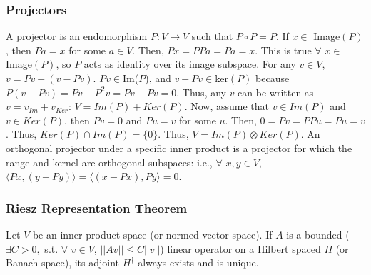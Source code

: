 \documentclass[11pt]{article}
\begin{document}
	\subsubsection*{Projectors}
	A projector	is an endomorphism $P: V\rightarrow V$ such that $P\circ P = P$. If $x\in$ Image$(P)$, then $Pa=x$ for some $a\in V$. Then, $Px = PPa = Pa = x$. This is true $\forall$ $x\in$ Image$(P)$, so $P$ acts as identity over its image subspace. For any $v\in V$, $v = Pv + (v - Pv)$. $Pv\in$Im($P$), and $v-Pv\in$ker$(P)$ because $P(v-Pv)=Pv-P^2v=Pv-Pv=0$. Thus, any $v$ can be written as $v=v_{Im}+v_{Ker}$: $V = Im(P) + Ker(P)$. Now, assume that $v\in Im(P)$ and $v\in Ker(P)$, then $Pv=0$ and $Pu=v$ for some $u$. Then, $0=Pv=PPu=Pu=v$. Thus, $Ker(P)\cap Im(P)=\{0\}$. Thus, $V=Im(P)\otimes Ker(P)$. An orthogonal projector under a specific inner product is a projector for which the range and kernel are orthogonal subspaces: i.e., $\forall$ $x, y\in V$, $\langle Px, (y-Py)\rangle=\langle(x-Px), Py\rangle=0$.
	
	\subsubsection*{Riesz Representation Theorem}
	Let $V$ be an inner product space (or normed vector space). If $A$ is a bounded ($\exists C > 0,$ s.t. $\forall$ $v\in V$, $||Av||\le C||v||$) linear operator on a Hilbert spaced $H$ (or Banach space), its adjoint $H^\dagger$ always exists and is unique.
	
\end{document}
